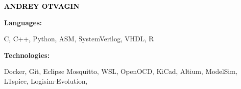 \documentclass[9pt]{developercv} %
\begin{document}

\begin{minipage}[t]{0.5\textwidth} 
	\vspace{-\baselineskip} %
	
	{ \fontsize{16}{20} \textcolor{black}{\textbf{\MakeUppercase{Andrey Otvagin}}}} %
	
	\vspace{6pt}
    \hspace{12pt}

    \hspace{12pt}
    
    \hspace{12pt}

    
\end{minipage}
\hfill
\begin{minipage}[t]{0.5\textwidth}
    \vspace{-18pt}
    \vspace{-6pt}
    
    \begin{minipage}[t]{0.2\textwidth}
        \textbf{Languages:}
    \end{minipage}
    \hfill
    \begin{minipage}[t]{0.73\textwidth}
        C, C++, Python, ASM, SystemVerilog, VHDL, R
    \end{minipage}
    \vspace{4mm}
    
    \begin{minipage}[t]{0.2\textwidth}
        \textbf{Technologies:}
    \end{minipage}
    \hfill
    \begin{minipage}[t]{0.73\textwidth}
        Docker, Git, Eclipse Mosquitto, WSL, OpenOCD, KiCad, Altium, ModelSim, LTspice, Logisim-Evolution, 
    \end{minipage}
    
\end{minipage}
\end{document}
